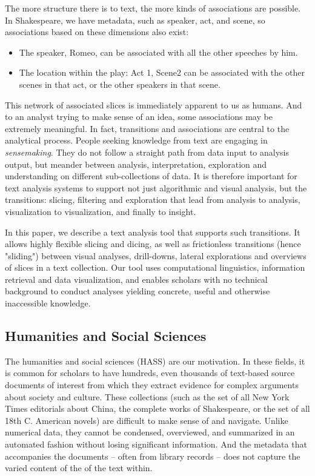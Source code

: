 \documentclass{sig-alternate}
\begin{document}
The more structure there is to text, the more kinds of associations are possible. In Shakespeare, we have metadata, such as speaker, act, and scene, so associations based on these dimensions also exist:
\begin{itemize}
\item The speaker, Romeo, can be associated with all the other speeches by him.
\item The location within the play: Act 1, Scene2 can be associated with the other scenes in that act, or the other speakers in that scene.
\end{itemize}

This network of associated slices is immediately apparent to us as humans. And to an analyst trying to make sense of an idea, some associations may be extremely meaningful. In fact, transitions  and associations are central to the analytical process. People seeking knowledge from text are engaging in \emph{sensemaking}. They do not follow a straight path from data input to analysis output, but meander between analysis, interpretation, exploration and understanding on different sub-collections of data.  It is therefore important for text analysis systems to support not just algorithmic and visual analysis, but the transitions: slicing, filtering and exploration that lead from analysis to analysis, visualization to visualization, and finally to insight.

In this paper, we describe a text analysis tool that supports such transitions. It allows highly flexible slicing and dicing, as well as frictionless transitions (hence "sliding") between visual analyses, drill-downs, lateral explorations and overviews of slices in a text collection. Our tool uses computational linguistics, information retrieval and data visualization, and enables scholars with no technical background to conduct analyses yielding concrete, useful and otherwise inaccessible knowledge.

\subsection{Humanities and Social Sciences}
The humanities and social sciences (HASS) are our motivation. In these fields, it is common for scholars to have hundreds, even thousands of text-based source documents of interest from which they extract evidence for complex arguments about society and culture. These collections (such as the set of all New York Times editorials about China, the complete works of Shakespeare, or the set of all 18th C. American novels)  are difficult to make sense of and navigate. Unlike numerical data, they cannot be condensed, overviewed, and summarized in an automated fashion without losing significant information. And the metadata that accompanies the documents -- often from library records -- does not capture the varied content of the of the text within.
\end{document}
